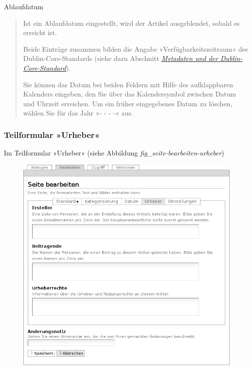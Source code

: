 \documentclass[a4paper,12pt,ngerman]{manual}
\begin{document}
Ablaufdatum
\begin{quote}

Ist ein Ablaufdatum eingestellt, wird der Artikel ausgeblendet, sobald es
erreicht ist.

Beide Einträge zusammen bilden die Angabe »Verfügbarkeitszeitraum« des
Dublin-Core-Standards (siehe dazu Abschnitt \hyperlink{sec-exkurs-metadaten}{\emph{Metadaten und der Dublin-Core-Standard}}).

Sie können das Datum bei beiden Feldern mit Hilfe des aufklappbaren Kalenders
eingeben, den Sie über das Kalendersymbol zwischen Datum und Uhrzeit
erreichen. Um ein früher eingegebenes Datum zu löschen, wählen Sie für das
Jahr »- - - -« aus.
\end{quote}
\hypertarget{sec-teilformular-urheber}{}

\subsubsection{Teilformular »Urheber«}

Im Teilformular »Urheber« (siehe
Abbildung \emph{fig\_seite-bearbeiten-urheber})
\hypertarget{fig-seite-bearbeiten-urheber}{}\begin{figure}[htbp]
\centering

\includegraphics{seite-bearbeiten-urheber.png}
\end{figure}
\end{document}
